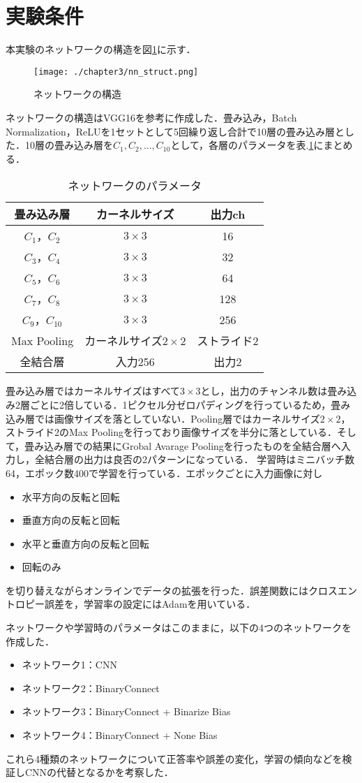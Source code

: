 \section{実験条件}
本実験のネットワークの構造を図\ref{fig_nnst}に示す．
\begin{figure}[htbp]
  \begin{center}
    \texttt{[image: ./chapter3/nn\_struct.png]}
    \caption{ネットワークの構造}
    \label{fig_nnst}
  \end{center}
\end{figure}

ネットワークの構造はVGG16を参考に作成した．畳み込み，Batch Normalization，ReLUを1セットとして5回繰り返し合計で10層の畳み込み層とした．10層の畳み込み層を$C_1, C_2,  \ldots , C_{10}$として，各層のパラメータを表.\ref{table_network_parameter}にまとめる．
\begin{table}
  \caption{ネットワークのパラメータ}
  \label{table_network_parameter}
  \centering
  \begin{tabular}{ccc}
    \hline
    畳み込み層  & カーネルサイズ & 出力ch \\
    \hline \hline
    $C_1$，$C_2$ & $3\times 3$ & 16\\
    $C_3$，$C_4$ & $3\times 3$ & 32\\
    $C_5$，$C_6$ & $3\times 3$ & 64\\
    $C_7$，$C_8$ & $3\times 3$ & 128\\
    $C_9$，$C_{10}$ & $3\times 3$ & 256\\
    \hline
    Max Pooling & カーネルサイズ$2\times 2$ & ストライド2\\
    全結合層 & 入力256 & 出力2\\
    \hline
  \end{tabular}
\end{table}
畳み込み層ではカーネルサイズはすべて$3\times 3$とし，出力のチャンネル数は畳み込み2層ごとに2倍している．1ピクセル分ゼロパディングを行っているため，畳み込み層では画像サイズを落としていない．Pooling層ではカーネルサイズ$2\times 2$，ストライド2のMax Poolingを行っており画像サイズを半分に落としている．そして，畳み込み層での結果にGrobal Avarage Poolingを行ったものを全結合層へ入力し，全結合層の出力は良否の2パターンになっている．
学習時はミニバッチ数64，エポック数400で学習を行っている．エポックごとに入力画像に対し
\begin{itemize}
  \item 水平方向の反転と回転
  \item 垂直方向の反転と回転
  \item 水平と垂直方向の反転と回転
  \item 回転のみ
\end{itemize}
を切り替えながらオンラインでデータの拡張を行った．誤差関数にはクロスエントロピー誤差を，学習率の設定にはAdamを用いている．

ネットワークや学習時のパラメータはこのままに，以下の4つのネットワークを作成した．
\begin{itemize}
  \item ネットワーク1：CNN
  \item ネットワーク2：BinaryConnect
  \item ネットワーク3：BinaryConnect + Binarize Bias
  \item ネットワーク4：BinaryConnect + None Bias
\end{itemize}
これら4種類のネットワークについて正答率や誤差の変化，学習の傾向などを検証しCNNの代替となるかを考察した．